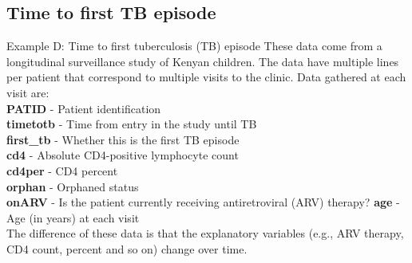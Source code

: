 \documentclass[envcountsect, 10pt, portrait, palatino]{beamer}
\begin{document}
\subsection{Time to first TB episode}
\begin{frame}{Example D: Time to first tuberculosis (TB) episode}
These data come from a longitudinal surveillance study of Kenyan children.  The data have
multiple lines per patient that correspond to multiple visits to the clinic.
Data gathered at each visit are:\\[2ex]
{\bf PATID} - Patient identification\\
{\bf timetotb} - Time from entry in the study until TB\\
{\bf first\_tb} - Whether this is the first TB episode\\
{\bf cd4} - Absolute CD4-positive lymphocyte count\\
{\bf cd4per} - CD4 percent\\
{\bf orphan} - Orphaned status\\
{\bf onARV} - Is the patient currently receiving antiretroviral (ARV) therapy?
{\bf age} - Age (in years) at each visit\\[2ex]
The difference of these data is that the explanatory variables (e.g., ARV therapy, CD4 count,
percent and so on) change over time.
\end{frame}
\end{document}
